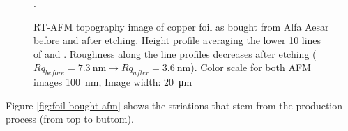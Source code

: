	\begin{figure}\centering
		 \quad
		 \quad
		\caption{RT-AFM topography image of copper foil as bought from Alfa Aesar  before and  after etching.  Height profile averaging the lower 10 lines of  and . Roughness along the line profiles decreases after etching ($Rq_{before}=\SI{7.3}{\nano \meter} \rightarrow Rq_{after}=\SI{3.6}{\nano \meter}$). Color scale for both AFM images \SI{100}{\nano \meter}, Image width: \SI{20}{\micro \meter}}.
		\label{fig:foil-afm-as-bought}
	\end{figure}
	
	Figure \ref{fig:foil-bought-afm} shows the striations that stem from the production process (from top to buttom).
	
